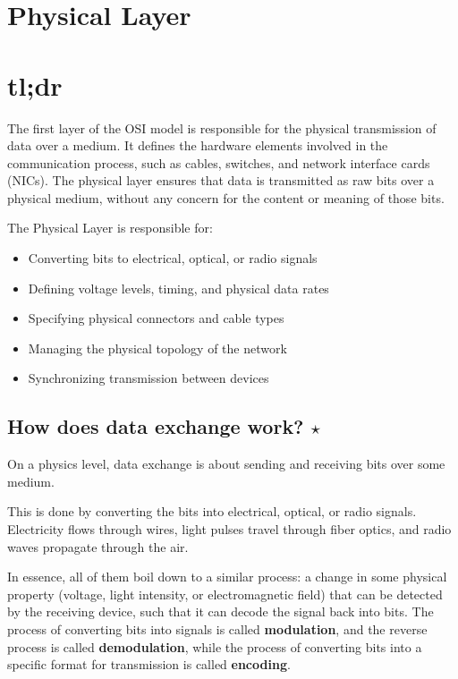 \section{Physical Layer}\label{sec:osi_physical}
\section*{tl;dr}
The first layer of the OSI model is responsible for the physical transmission of data over a medium. It defines the hardware elements involved in the communication process, such as cables, switches, and network interface cards (NICs). The physical layer ensures that data is transmitted as raw bits over a physical medium, without any concern for the content or meaning of those bits.

The Physical Layer is responsible for:
\begin{itemize}
    \item Converting bits to electrical, optical, or radio signals
    \item Defining voltage levels, timing, and physical data rates
    \item Specifying physical connectors and cable types
    \item Managing the physical topology of the network
    \item Synchronizing transmission between devices
\end{itemize}


\subsection*{How does data exchange work? $\star$}
On a physics level, data exchange is about sending and receiving bits over some medium. 

This is done by converting the bits into electrical, optical, or radio signals. Electricity flows through wires, light pulses travel through fiber optics, and radio waves propagate through the air.


In essence, all of them boil down to a similar process: a change in some physical property (voltage, light intensity, or electromagnetic field) that can be detected by the receiving device, such that it can decode the signal back into bits. The process of converting bits into signals is called \textbf{modulation}, and the reverse process is called \textbf{demodulation}, while the process of converting bits into a specific format for transmission is called \textbf{encoding}.

